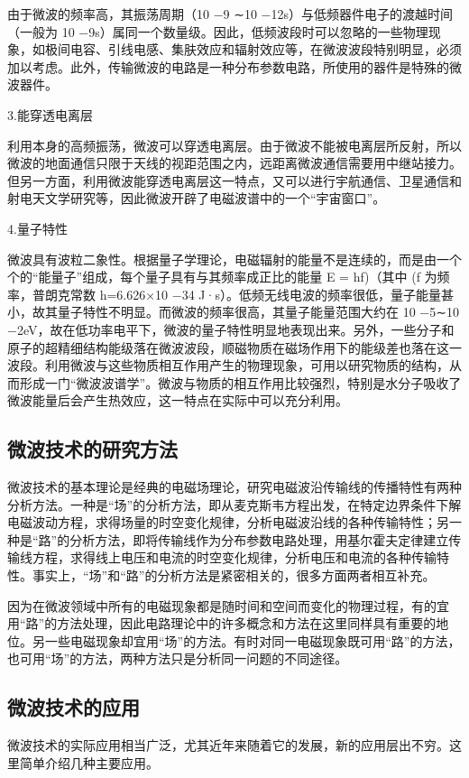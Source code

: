 由于微波的频率高，其振荡周期（10 −9 ∼10 −12s）与低频器件电子的渡越时间（一般为 10 −9s）属同一个数量级。因此，低频波段时可以忽略的一些物理现象，如极间电容、引线电感、集肤效应和辐射效应等，在微波波段特别明显，必须加以考虑。此外，传输微波的电路是一种分布参数电路，所使用的器件是特殊的微波器件。

3.能穿透电离层

利用本身的高频振荡，微波可以穿透电离层。由于微波不能被电离层所反射，所以微波的地面通信只限于天线的视距范围之内，远距离微波通信需要用中继站接力。但另一方面，利用微波能穿透电离层这一特点，又可以进行宇航通信、卫星通信和射电天文学研究等，因此微波开辟了电磁波谱中的一个“宇宙窗口”。

4.量子特性

微波具有波粒二象性。根据量子学理论，电磁辐射的能量不是连续的，而是由一个个的“能量子”组成，每个量子具有与其频率成正比的能量 E = hf)（其中 (f 为频率，普朗克常数 h=6.626×10 −34
J·s）。低频无线电波的频率很低，量子能量甚小，故其量子特性不明显。而微波的频率很高，其量子能量范围大约在 10 −5∼10 −2eV，故在低功率电平下，微波的量子特性明显地表现出来。另外，一些分子和原子的超精细结构能级落在微波波段，顺磁物质在磁场作用下的能级差也落在这一波段。利用微波与这些物质相互作用产生的物理现象，可用以研究物质的结构，从而形成一门“微波波谱学”。微波与物质的相互作用比较强烈，特别是水分子吸收了微波能量后会产生热效应，这一特点在实际中可以充分利用。

\subsection{微波技术的研究方法}
微波技术的基本理论是经典的电磁场理论，研究电磁波沿传输线的传播特性有两种分析方法。一种是“场”的分析方法，即从麦克斯韦方程出发，在特定边界条件下解电磁波动方程，求得场量的时空变化规律，分析电磁波沿线的各种传输特性；另一种是“路”的分析方法，即将传输线作为分布参数电路处理，用基尔霍夫定律建立传输线方程，求得线上电压和电流的时空变化规律，分析电压和电流的各种传输特性。事实上，“场”和“路”的分析方法是紧密相关的，很多方面两者相互补充。

因为在微波领域中所有的电磁现象都是随时间和空间而变化的物理过程，有的宜用“路”的方法处理，因此电路理论中的许多概念和方法在这里同样具有重要的地位。另一些电磁现象却宜用“场”的方法。有时对同一电磁现象既可用“路”的方法，也可用“场”的方法，两种方法只是分析同一问题的不同途径。

\subsection{微波技术的应用}
微波技术的实际应用相当广泛，尤其近年来随着它的发展，新的应用层出不穷。这里简单介绍几种主要应用。

